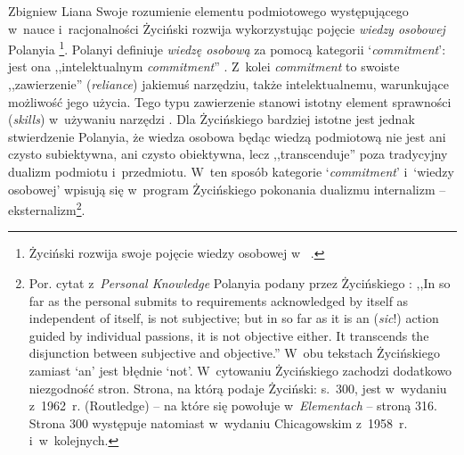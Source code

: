 \begin{artplenv}{Zbigniew Liana}
Swoje rozumienie elementu podmiotowego występującego w~nauce i~racjonalności Życiński rozwija wykorzystując pojęcie \textit{wiedzy osobowej} Polanyia
\parencite*[][]{polanyi_personal_1962}%
\footnote{Życiński rozwija swoje pojęcie wiedzy osobowej w~
\parencites[][s.~179–187]{zycinski_elementy_1996}[][s.~243–254]{zycinski_elementy_2015}.%
}. Polanyi definiuje \textit{wiedzę osobową} za pomocą kategorii ‘\textit{commitment}': jest ona ,,intelektualnym \textit{commitment}'' 
\parencite[][s.~IV]{polanyi_personal_1962}. %
 Z~kolei \textit{commitment} to swoiste ,,zawierzenie'' (\textit{reliance}) jakiemuś narzędziu, także intelektualnemu, warunkujące możliwość jego użycia. Tego typu zawierzenie stanowi istotny element sprawności (\textit{skills}) w~używaniu narzędzi 
\parencite[][s.~63]{polanyi_personal_1962}. %
 Dla Życińskiego bardziej istotne jest jednak stwierdzenie Polanyia, że wiedza osobowa będąc wiedzą podmiotową nie jest ani czysto subiektywna, ani czysto obiektywna, lecz ,,transcenduje'' poza tradycyjny dualizm podmiotu i~przedmiotu. W~ten sposób kategorie ‘\textit{commitment}' i~‘wiedzy osobowej' wpisują się w~program Życińskiego pokonania dualizmu internalizm -- eksternalizm\footnote{Por. cytat z~\textit{Personal Knowledge} Polanyia podany przez Życińskiego 
\parencites[][s.~183, przypis 276]{zycinski_elementy_1996}[][s.~249, przypis 11]{zycinski_elementy_2015}: %
 ,,In so far as the personal submits to requirements acknowledged by itself as independent of itself, is not subjective; but in so far as it is an (\textit{sic}!) action guided by individual passions, it is not objective either. It transcends the disjunction between subjective and objective.'' W~obu tekstach Życińskiego zamiast ‘an' jest błędnie ‘not'. W~cytowaniu Życińskiego zachodzi dodatkowo niezgodność stron. Strona, na którą podaje Życiński: s.~300, jest w~wydaniu z~1962~r. (Routledge) -- na które się powołuje w~\textit{Elementach} -- stroną 316. Strona 300 występuje natomiast w~wydaniu Chicagowskim z~1958~r. i~w~kolejnych.}.


\end{artplenv}

